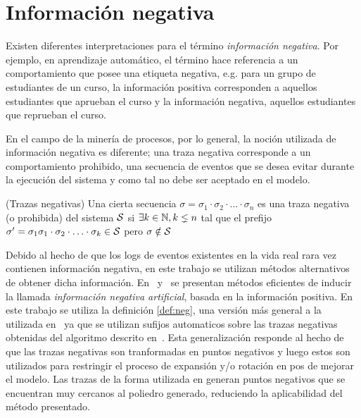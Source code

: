\section{Información negativa} 
\label{sec:2.negative}

Existen diferentes interpretaciones para el término \textit{información negativa}. Por ejemplo, en aprendizaje automático,
el término hace referencia a un comportamiento que posee una etiqueta negativa, e.g. para un grupo
de estudiantes de un curso, la información positiva corresponden a aquellos estudiantes que aprueban el curso
y la información negativa, aquellos estudiantes que reprueban el curso. 

En el campo de la minería de procesos, por lo general, la noción utilizada de información negativa es diferente;
una traza negativa corresponde a un comportamiento prohibido, una secuencia de eventos que se desea 
evitar durante la ejecución del sistema y como tal no debe ser aceptado en el modelo.

\begin{definition}
    \label{def:neg}
    (Trazas negativas) Una cierta secuencia $\sigma=\sigma_1\cdot\sigma_2\cdot\ldots\cdot\sigma_n$ es
    una traza negativa (o prohibida) del sistema $\mathcal{S}$ si $\exists k \in \mathbb{N}, k \lneq n$ tal que
    el prefijo $\sigma'=\sigma_1\sigma_1\cdot\sigma_2\cdot\ldots\cdot\sigma_k \in \mathcal{S}$ pero $\sigma \notin \mathcal{S}$
\end{definition}

    Debido al hecho de que los logs de eventos existentes en la vida real rara vez contienen información negativa, 
en este trabajo se utilizan métodos alternativos de obtener dicha información. En~\cite{Goedertier2009} 
y~\cite{BrouckeWVB14} se presentan métodos eficientes de inducir la llamada \textit{información negativa artificial},
basada en la información positiva. 
En este trabajo se utiliza la definición \autoref{def:neg}, una versión más general 
a la utilizada en~\cite{Goedertier2009,BrouckeWVB14} ya que se utilizan sufijos
automaticos sobre las trazas negativas obtenidas del algoritmo 
descrito en~\cite{BrouckeWVB14}.
Esta generalización responde al hecho  de que las trazas negativas 
son tranformadas en puntos negativos y luego estos son utilizados
para restringir el proceso de expansión y/o rotación en pos de mejorar el modelo.
Las trazas de la forma utilizada en \cite{Goedertier2009,BrouckeWVB14} generan
puntos negativos que se encuentran muy cercanos al poliedro generado, reduciendo la aplicabilidad del 
método presentado.



